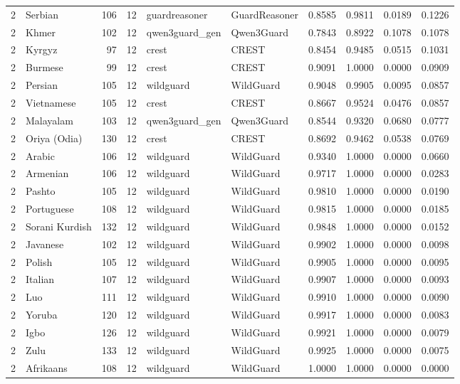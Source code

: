 \begin{tabular}{rlrrllrrrr}
2 & Serbian & 106 & 12 & guardreasoner & GuardReasoner & 0.8585 & 0.9811 & 0.0189 & 0.1226 \\
2 & Khmer & 102 & 12 & qwen3guard\_gen & Qwen3Guard & 0.7843 & 0.8922 & 0.1078 & 0.1078 \\
2 & Kyrgyz & 97 & 12 & crest & CREST & 0.8454 & 0.9485 & 0.0515 & 0.1031 \\
2 & Burmese & 99 & 12 & crest & CREST & 0.9091 & 1.0000 & 0.0000 & 0.0909 \\
2 & Persian & 105 & 12 & wildguard & WildGuard & 0.9048 & 0.9905 & 0.0095 & 0.0857 \\
2 & Vietnamese & 105 & 12 & crest & CREST & 0.8667 & 0.9524 & 0.0476 & 0.0857 \\
2 & Malayalam & 103 & 12 & qwen3guard\_gen & Qwen3Guard & 0.8544 & 0.9320 & 0.0680 & 0.0777 \\
2 & Oriya (Odia) & 130 & 12 & crest & CREST & 0.8692 & 0.9462 & 0.0538 & 0.0769 \\
2 & Arabic & 106 & 12 & wildguard & WildGuard & 0.9340 & 1.0000 & 0.0000 & 0.0660 \\
2 & Armenian & 106 & 12 & wildguard & WildGuard & 0.9717 & 1.0000 & 0.0000 & 0.0283 \\
2 & Pashto & 105 & 12 & wildguard & WildGuard & 0.9810 & 1.0000 & 0.0000 & 0.0190 \\
2 & Portuguese & 108 & 12 & wildguard & WildGuard & 0.9815 & 1.0000 & 0.0000 & 0.0185 \\
2 & Sorani Kurdish & 132 & 12 & wildguard & WildGuard & 0.9848 & 1.0000 & 0.0000 & 0.0152 \\
2 & Javanese & 102 & 12 & wildguard & WildGuard & 0.9902 & 1.0000 & 0.0000 & 0.0098 \\
2 & Polish & 105 & 12 & wildguard & WildGuard & 0.9905 & 1.0000 & 0.0000 & 0.0095 \\
2 & Italian & 107 & 12 & wildguard & WildGuard & 0.9907 & 1.0000 & 0.0000 & 0.0093 \\
2 & Luo & 111 & 12 & wildguard & WildGuard & 0.9910 & 1.0000 & 0.0000 & 0.0090 \\
2 & Yoruba & 120 & 12 & wildguard & WildGuard & 0.9917 & 1.0000 & 0.0000 & 0.0083 \\
2 & Igbo & 126 & 12 & wildguard & WildGuard & 0.9921 & 1.0000 & 0.0000 & 0.0079 \\
2 & Zulu & 133 & 12 & wildguard & WildGuard & 0.9925 & 1.0000 & 0.0000 & 0.0075 \\
2 & Afrikaans & 108 & 12 & wildguard & WildGuard & 1.0000 & 1.0000 & 0.0000 & 0.0000 \\

\end{tabular}
